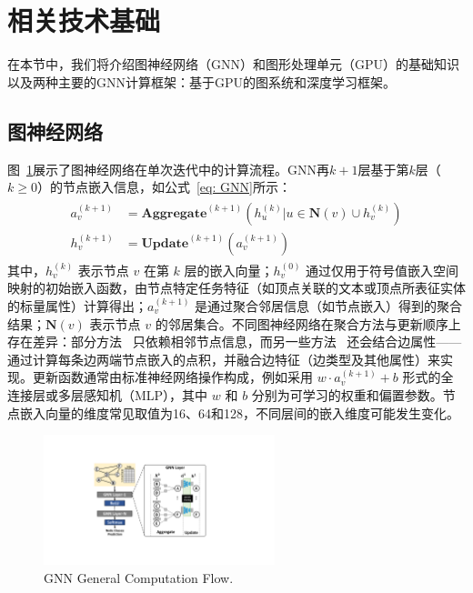 \section{相关技术基础}
在本节中，我们将介绍图神经网络（GNN）和图形处理单元（GPU）的基础知识以及两种主要的GNN计算框架：基于GPU的图系统和深度学习框架。

\subsection{图神经网络}
图~\ref{fig:gnn-computation-flow}展示了图神经网络在单次迭代中的计算流程。GNN再$k+1$层基于第$k$层（$k\geq 0$）的节点嵌入信息，如公式~\ref{eq: GNN}所示：
\begin{gather} \label{eq: GNN}
    \begin{aligned} 
      a_{v}^{(k+1)}  &= \mathbf{Aggregate}^{(k+1)}({h_{u}^{(k)}|u\in \mathbf{N}(v)\cup h_v^{(k)}}) \\
      h_{v}^{(k+1)}  &= \mathbf{Update}^{(k+1)}(a_{v}^{(k+1)})
   \end{aligned}   
\end{gather}
其中，$h_{v}^{(k)}$ 表示节点 $v$ 在第 $k$ 层的嵌入向量；$h_v^{(0)}$ 通过仅用于符号值嵌入空间映射的初始嵌入函数，由节点特定任务特征（如顶点关联的文本或顶点所表征实体的标量属性）计算得出；$a_{v}^{(k+1)}$ 是通过聚合邻居信息（如节点嵌入）得到的聚合结果；$\mathbf{N}(v)$ 表示节点 $v$ 的邻居集合。不同图神经网络在聚合方法与更新顺序上存在差异：部分方法~\cite{GCNConv, SageConv} 只依赖相邻节点信息，而另一些方法~\cite{GATConv} 还会结合边属性——通过计算每条边两端节点嵌入的点积，并融合边特征（边类型及其他属性）来实现。更新函数通常由标准神经网络操作构成，例如采用 $w\cdot a_{v}^{(k+1)} + b$ 形式的全连接层或多层感知机（MLP），其中 $w$ 和 $b$ 分别为可学习的权重和偏置参数。节点嵌入向量的维度常见取值为16、64和128，不同层间的嵌入维度可能发生变化。
\begin{figure}[htbp] %
    \centering
    \includegraphics[width=0.6\textwidth]{images/gnn_background.pdf} %
    \vspace{-5pt} %
    \caption{GNN General Computation Flow.}
    \label{fig:gnn-computation-flow} %
\end{figure}

